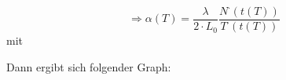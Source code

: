 \begin{equation}
\Rightarrow \alpha (T) = \frac{\lambda}{2 \cdot L_{0}} \frac{N^{\cdot}(t(T))}{T^{\cdot}(t(T))}
\end{equation} 
mit 

Dann ergibt sich folgender Graph:

